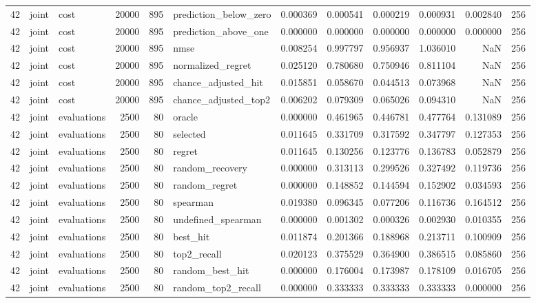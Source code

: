 \begin{tabular}{rllrrlrrrrrr}
42 & joint & cost & 20000 & 895 & prediction_below_zero & 0.000369 & 0.000541 & 0.000219 & 0.000931 & 0.002840 & 256 \\
42 & joint & cost & 20000 & 895 & prediction_above_one & 0.000000 & 0.000000 & 0.000000 & 0.000000 & 0.000000 & 256 \\
42 & joint & cost & 20000 & 895 & nmse & 0.008254 & 0.997797 & 0.956937 & 1.036010 & NaN & 256 \\
42 & joint & cost & 20000 & 895 & normalized_regret & 0.025120 & 0.780680 & 0.750946 & 0.811104 & NaN & 256 \\
42 & joint & cost & 20000 & 895 & chance_adjusted_hit & 0.015851 & 0.058670 & 0.044513 & 0.073968 & NaN & 256 \\
42 & joint & cost & 20000 & 895 & chance_adjusted_top2 & 0.006202 & 0.079309 & 0.065026 & 0.094310 & NaN & 256 \\
42 & joint & evaluations & 2500 & 80 & oracle & 0.000000 & 0.461965 & 0.446781 & 0.477764 & 0.131089 & 256 \\
42 & joint & evaluations & 2500 & 80 & selected & 0.011645 & 0.331709 & 0.317592 & 0.347797 & 0.127353 & 256 \\
42 & joint & evaluations & 2500 & 80 & regret & 0.011645 & 0.130256 & 0.123776 & 0.136783 & 0.052879 & 256 \\
42 & joint & evaluations & 2500 & 80 & random_recovery & 0.000000 & 0.313113 & 0.299526 & 0.327492 & 0.119736 & 256 \\
42 & joint & evaluations & 2500 & 80 & random_regret & 0.000000 & 0.148852 & 0.144594 & 0.152902 & 0.034593 & 256 \\
42 & joint & evaluations & 2500 & 80 & spearman & 0.019380 & 0.096345 & 0.077206 & 0.116736 & 0.164512 & 256 \\
42 & joint & evaluations & 2500 & 80 & undefined_spearman & 0.000000 & 0.001302 & 0.000326 & 0.002930 & 0.010355 & 256 \\
42 & joint & evaluations & 2500 & 80 & best_hit & 0.011874 & 0.201366 & 0.188968 & 0.213711 & 0.100909 & 256 \\
42 & joint & evaluations & 2500 & 80 & top2_recall & 0.020123 & 0.375529 & 0.364900 & 0.386515 & 0.085860 & 256 \\
42 & joint & evaluations & 2500 & 80 & random_best_hit & 0.000000 & 0.176004 & 0.173987 & 0.178109 & 0.016705 & 256 \\
42 & joint & evaluations & 2500 & 80 & random_top2_recall & 0.000000 & 0.333333 & 0.333333 & 0.333333 & 0.000000 & 256 \\

\end{tabular}
